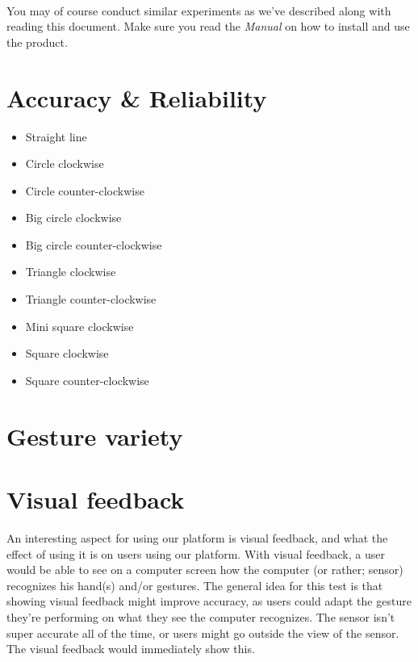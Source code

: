\documentclass[a4paper]{article}
\providecommand{\tightlist}{%
\setlength{\itemsep}{0pt}\setlength{\parskip}{0pt}}
\begin{document}
  \paragraph{}
  You may of course conduct similar experiments as we've described along with
  reading this document. Make sure you read the \emph{Manual} on how to install
  and use the product.

  \clearpage

  \section*{Accuracy \& Reliability}

  \begin{itemize}
    \tightlist
    \item Straight line
    \item Circle clockwise
    \item Circle counter-clockwise
    \item Big circle clockwise
    \item Big circle counter-clockwise
    \item Triangle clockwise
    \item Triangle counter-clockwise
    \item Mini square clockwise
    \item Square clockwise
    \item Square counter-clockwise
  \end{itemize}

  \section*{Gesture variety}

  \clearpage

  \section*{Visual feedback}
  An interesting aspect for using our platform is visual feedback, and what the
  effect of using it is on users using our platform. With visual feedback, a
  user would be able to see on a computer screen how the computer (or rather;
  sensor) recognizes his hand(s) and/or gestures. The general idea for this test
  is that showing visual feedback might improve accuracy, as users could adapt
  the gesture they're performing on what they see the computer recognizes.
  The sensor isn't super accurate all of the time, or users might go outside the
  view of the sensor. The visual feedback would immediately show this.
\end{document}
